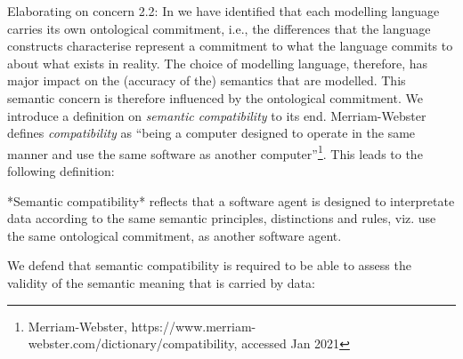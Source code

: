 \documentclass[sort&compress,preprint,authoryear,3p,twocolumn]{elsarticle}
\begin{document}
Elaborating on concern 2.2: In \citep{Brandt2021a} we have identified
that each modelling language carries its own ontological commitment,
i.e., the differences that the language constructs characterise
represent a commitment to what the language commits to about what exists
in reality. The choice of modelling language, therefore, has major
impact on the (accuracy of the) semantics that are modelled. This
semantic concern is therefore influenced by the ontological commitment.
We introduce a definition on \emph{semantic compatibility} to its end.
Merriam-Webster defines \emph{compatibility} as ``being a computer
designed to operate in the same manner and use the same software as
another computer''\footnote{Merriam-Webster,
  https://www.merriam-webster.com/dictionary/compatibility, accessed Jan
  2021}. This leads to the following definition:

\begin{mmdef}\label{def:semantic-compatibility}
*Semantic compatibility* reflects that a software agent is designed to interpretate data according to the same semantic principles, distinctions and rules, viz. use the same ontological commitment, as another software agent. 
\end{mmdef}

We defend that semantic compatibility is required to be able to assess
the validity of the semantic meaning that is carried by data:
\end{document}
